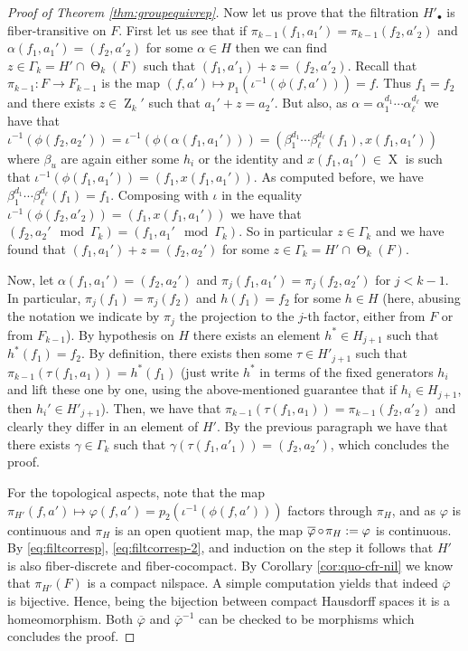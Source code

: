 \documentclass[a4paper,12pt,reqno]{amsart}
\theoremstyle{definition}
\def\to{\rightarrow}
\DeclareMathOperator{\ab}{Z}
\DeclareMathOperator{\tran}{\Theta}
\DeclareMathOperator{\ns}{X}
\DeclareMathOperator{\co}{\circ\hspace{-0.02 cm}}
\begin{document}
\begin{proof}[Proof of Theorem \ref{thm:groupequivrep}]
Now let us prove that the filtration $H'_\bullet$ is fiber-transitive on $F$. First let us see that if $\pi_{k-1}(f_1,a_1')=\pi_{k-1}(f_2,a'_2)$ and $\alpha(f_1,a_1')=(f_2,a'_2)$ for some $\alpha\in H$ then we can find $z\in \Gamma_k=H'\cap\tran_k(F)$ such that $(f_1,a'_1)+z=(f_2,a'_2)$. Recall that  $\pi_{k-1}:F\to F_{k-1}$ is the map $(f,a')\mapsto p_1(\iota^{-1}(\phi(f,a')))=f$. Thus $f_1=f_2$ and there exists $z\in \ab_k'$ such that $a_1'+z=a_2'$. But also, as $\alpha=\alpha^{d_1}_1\cdots \alpha^{d_\ell}_\ell$ we have that $\iota^{-1}(\phi(f_2,a_2')) = \iota^{-1}(\phi(\alpha(f_1,a_1'))) = (\beta^{d_1}_1\cdots \beta^{d_\ell}_\ell(f_1),x(f_1,a_1')) $ where $\beta_u$ are again either some $h_i$ or the identity and $x(f_1,a_1')\in \ns$ is such that $\iota^{-1}(\phi(f_1,a_1'))=(f_1,x(f_1,a_1'))$. As computed before, we have $\beta^{d_1}_1\cdots \beta^{d_\ell}_\ell(f_1) = f_1$. Composing with $\iota$ in the equality $\iota^{-1}(\phi(f_2,a'_2))=(f_1,x(f_1,a_1'))$ we have that $(f_2,a_2'\mod \Gamma_k)=(f_1,a_1'\mod\Gamma_k)$. So in particular $z\in \Gamma_k$ and we have found that $(f_1,a_1')+z=(f_2,a_2')$ for some $z\in \Gamma_k=H'\cap \tran_k(F)$.

Now, let $\alpha(f_1,a_1')=(f_2,a_2')$ and $\pi_j(f_1,a_1')=\pi_j(f_2,a_2')$ for $j<k-1$. In particular, $\pi_j(f_1)=\pi_j(f_2)$ and $h(f_1)=f_2$ for some $h\in H$ (here, abusing the notation we indicate by $\pi_j$ the projection to the $j$-th factor, either from $F$ or from $F_{k-1}$). By hypothesis on $H$ there exists an element $h^*\in H_{j+1}$ such that $h^*(f_1)=f_2$. By definition, there exists then some $\tau\in H'_{j+1}$ such that $\pi_{k-1}(\tau(f_1,a_1)) = h^*(f_1)$ (just write $h^*$ in terms of the fixed generators $h_i$ and lift these one by one, using the above-mentioned guarantee that if $h_i\in H_{j+1}$, then $h_i'\in H'_{j+1}$). Then, we have that $\pi_{k-1}(\tau(f_1,a_1))=\pi_{k-1}(f_2,a'_2)$ and clearly they differ in an element of $H'$. By the previous paragraph we have that there exists $\gamma\in \Gamma_k$ such that $\gamma(\tau(f_1,a'_1))=(f_2,a_2')$, which concludes the proof.

For the topological aspects, note that the map $\pi_{H'}(f,a')\mapsto \varphi(f,a')=p_2(\iota^{-1}(\phi(f,a')))$ factors through $\pi_H$, and as $\varphi$ is continuous and $\pi_H$ is an open quotient map, the map $\overline{\varphi}\co \pi_H:=\varphi$ is continuous. By \eqref{eq:filtcorresp}, \eqref{eq:filtcorresp-2}, and induction on the step it follows that $H'$ is also fiber-discrete and fiber-cocompact. By Corollary \ref{cor:quo-cfr-nil} we know that $\pi_{H'}(F)$ is a compact nilspace. A simple computation yields that indeed $\overline{\varphi}$ is bijective. Hence, being the bijection between compact Hausdorff spaces it is a homeomorphism. Both $\overline{\varphi}$ and $\overline{\varphi}^{-1}$ can be checked to be morphisms which concludes the proof.
\end{proof}
\end{document}
